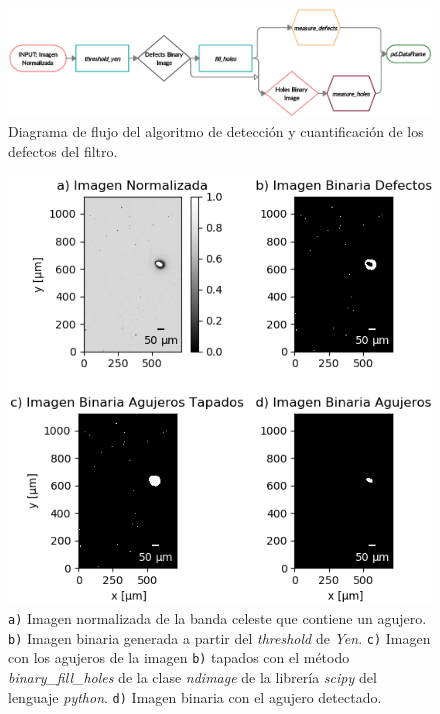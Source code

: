\begin{figure}[H]
\centering
\includegraphics[scale=0.75]{Figs/cuantificaciondefectos/diag_flujoalgor.png}
\caption{Diagrama de flujo del algoritmo de detección y cuantificación de los defectos del filtro.}
\label{fig:diagflujoalgor}
\end{figure}


\begin{figure}[H]
\centering
\includegraphics[scale=1.1]{Figs/defectosZEISS/algor_defecs.png}
\caption{\texttt{a)} Imagen normalizada de la banda celeste que contiene un agujero.  \texttt{b)} Imagen binaria generada a partir del \textit{threshold} de \textit{Yen}. \texttt{c)} Imagen con los agujeros de la imagen \texttt{b)} tapados con el método \textit{binary\_fill\_holes} de la clase \textit{ndimage} de la librería \textit{scipy} del lenguaje \textit{python}. \texttt{d)} Imagen binaria con el agujero detectado.}
\label{fig:flujoalgo}
\end{figure} 

